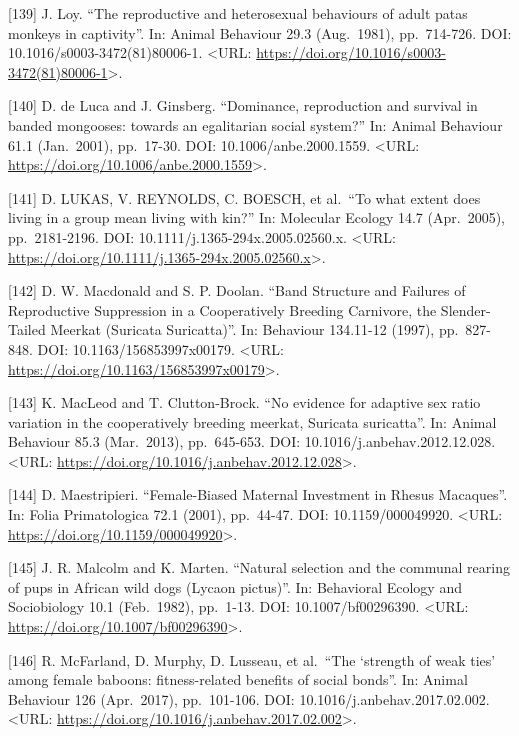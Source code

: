 \documentclass[
]{article}
\begin{document}
{[}139{]} J. Loy. ``The reproductive and heterosexual behaviours of
adult patas monkeys in captivity''. In: Animal Behaviour 29.3
(Aug.~1981), pp.~714-726. DOI: 10.1016/s0003-3472(81)80006-1.
\textless URL:
\url{https://doi.org/10.1016/s0003-3472(81)80006-1}\textgreater.

{[}140{]} D. de Luca and J. Ginsberg. ``Dominance, reproduction and
survival in banded mongooses: towards an egalitarian social system?''
In: Animal Behaviour 61.1 (Jan.~2001), pp.~17-30. DOI:
10.1006/anbe.2000.1559. \textless URL:
\url{https://doi.org/10.1006/anbe.2000.1559}\textgreater.

{[}141{]} D. LUKAS, V. REYNOLDS, C. BOESCH, et al.~``To what extent does
living in a group mean living with kin?'' In: Molecular Ecology 14.7
(Apr.~2005), pp.~2181-2196. DOI: 10.1111/j.1365-294x.2005.02560.x.
\textless URL:
\url{https://doi.org/10.1111/j.1365-294x.2005.02560.x}\textgreater.

{[}142{]} D. W. Macdonald and S. P. Doolan. ``Band Structure and
Failures of Reproductive Suppression in a Cooperatively Breeding
Carnivore, the Slender-Tailed Meerkat (Suricata Suricatta)''. In:
Behaviour 134.11-12 (1997), pp.~827-848. DOI: 10.1163/156853997x00179.
\textless URL:
\url{https://doi.org/10.1163/156853997x00179}\textgreater.

{[}143{]} K. MacLeod and T. Clutton-Brock. ``No evidence for adaptive
sex ratio variation in the cooperatively breeding meerkat, Suricata
suricatta''. In: Animal Behaviour 85.3 (Mar.~2013), pp.~645-653. DOI:
10.1016/j.anbehav.2012.12.028. \textless URL:
\url{https://doi.org/10.1016/j.anbehav.2012.12.028}\textgreater.

{[}144{]} D. Maestripieri. ``Female-Biased Maternal Investment in Rhesus
Macaques''. In: Folia Primatologica 72.1 (2001), pp.~44-47. DOI:
10.1159/000049920. \textless URL:
\url{https://doi.org/10.1159/000049920}\textgreater.

{[}145{]} J. R. Malcolm and K. Marten. ``Natural selection and the
communal rearing of pups in African wild dogs (Lycaon pictus)''. In:
Behavioral Ecology and Sociobiology 10.1 (Feb.~1982), pp.~1-13. DOI:
10.1007/bf00296390. \textless URL:
\url{https://doi.org/10.1007/bf00296390}\textgreater.

{[}146{]} R. McFarland, D. Murphy, D. Lusseau, et al.~``The `strength of
weak ties' among female baboons: fitness-related benefits of social
bonds''. In: Animal Behaviour 126 (Apr.~2017), pp.~101-106. DOI:
10.1016/j.anbehav.2017.02.002. \textless URL:
\url{https://doi.org/10.1016/j.anbehav.2017.02.002}\textgreater.
\end{document}
